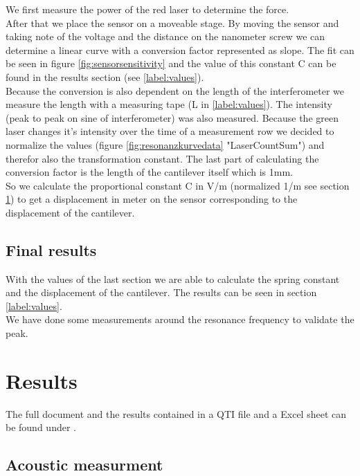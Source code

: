 \documentclass[12pt,a4paper]{article}
\begin{document}
We first measure the power of the red laser to determine the force. \\
After that we place the sensor on a moveable stage. By moving the sensor and taking note of the voltage and the distance on the nanometer screw we can determine a linear curve with a conversion factor represented as slope.
The fit can be seen in figure \ref{fig:sensorsensitivity} and the value of this constant C can be found in the results section (see \ref{label:values}).\\ 
Because the conversion is also dependent on the length of the interferometer we measure the length with a measuring tape (L in \ref{label:values}). The intensity (peak to peak on sine of interferometer) was also measured. Because the green laser changes it's intensity over the time of a measurement row we decided to normalize the values (figure \ref{fig:resonanzkurvedata} "LaserCountSum") and therefor also the transformation constant. The last part of calculating the conversion factor is the length of the cantilever itself which is 1mm.\\
So we calculate the proportional constant C in V/m (normalized 1/m see section \ref{label:results}) to get a displacement in meter on the sensor corresponding to the displacement of the cantilever.\\



\subsection{Final results}
With the values of the last section we are able to calculate the spring constant and the displacement of the cantilever. The results can be seen in section \ref{label:values}.\\
We have done some measurements around the resonance frequency to validate the peak.


\pagebreak

\section{Results}
\label{label:results}
The full document and the results contained in a QTI file and a Excel sheet can be found under \cite{github}.

\subsection{Acoustic measurment}
\end{document}
